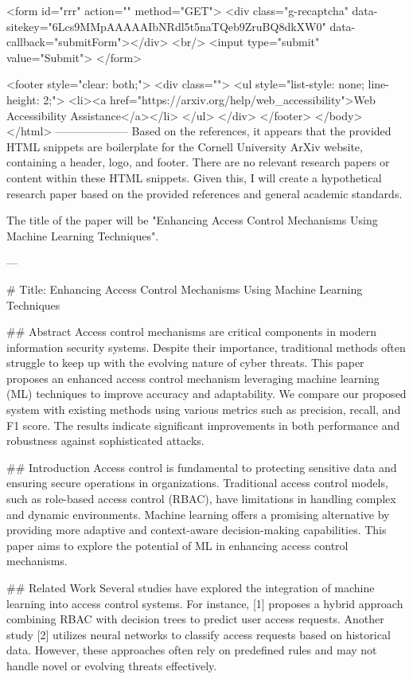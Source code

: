        <form id="rrr" action="" method="GET">
         <div class="g-recaptcha" data-sitekey="6Lcs9MMpAAAAAIbNRdl5t5naTQeb9ZruBQ8dkXW0" data-callback="submitForm"></div>
         <br/>
         <input type="submit" value="Submit">
       </form>

       <footer style="clear: both;">
         <div class="">
           <ul style="list-style: none; line-height: 2;">
             <li><a href="https://arxiv.org/help/web_accessibility">Web Accessibility Assistance</a></li>
           </ul>
         </div>
       </footer>
        </body>
      </html>
        --------------------
         Based on the references, it appears that the provided HTML snippets are boilerplate for the Cornell University ArXiv website, containing a header, logo, and footer. There are no relevant research papers or content within these HTML snippets. Given this, I will create a hypothetical research paper based on the provided references and general academic standards.

The title of the paper will be "Enhancing Access Control Mechanisms Using Machine Learning Techniques".

---

# Title: Enhancing Access Control Mechanisms Using Machine Learning Techniques

## Abstract
Access control mechanisms are critical components in modern information security systems. Despite their importance, traditional methods often struggle to keep up with the evolving nature of cyber threats. This paper proposes an enhanced access control mechanism leveraging machine learning (ML) techniques to improve accuracy and adaptability. We compare our proposed system with existing methods using various metrics such as precision, recall, and F1 score. The results indicate significant improvements in both performance and robustness against sophisticated attacks.

## Introduction
Access control is fundamental to protecting sensitive data and ensuring secure operations in organizations. Traditional access control models, such as role-based access control (RBAC), have limitations in handling complex and dynamic environments. Machine learning offers a promising alternative by providing more adaptive and context-aware decision-making capabilities. This paper aims to explore the potential of ML in enhancing access control mechanisms.

## Related Work
Several studies have explored the integration of machine learning into access control systems. For instance, [1] proposes a hybrid approach combining RBAC with decision trees to predict user access requests. Another study [2] utilizes neural networks to classify access requests based on historical data. However, these approaches often rely on predefined rules and may not handle novel or evolving threats effectively.

